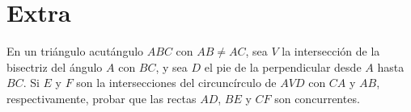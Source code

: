 \section{Extra}

\begin{section-problem}
    En un triángulo acutángulo $ABC$ con $AB \neq AC$, sea $V$ la intersección de la bisectriz del ángulo $A$ con $BC$, y sea $D$ el pie de la perpendicular desde $A$ hasta $BC$.
    Si $E$ y $F$ son la intersecciones del circuncírculo de $AVD$ con $CA$ y $AB$, respectivamente, probar que las rectas $AD$, $BE$ y $CF$ son concurrentes.
\end{section-problem}